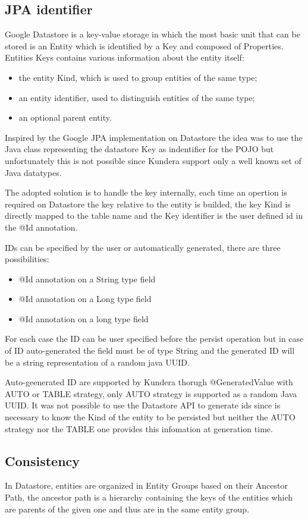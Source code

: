 \subsection{JPA identifier}
Google Datastore is a key-value storage in which the most basic unit that can be stored is an Entity which is identified by a Key and composed of Properties.
Entities Keys contains various information about the entity itself:
\begin{itemize}
\item the entity Kind, which is used to group entities of the same type;
\item an entity identifier, used to distinguish entities of the same type;
\item an optional parent entity. 
\end{itemize}
Inspired by the Google JPA implementation on Datastore the idea was to use the Java class representing the datastore Key as indentifier for the POJO but unfortunately this is not possible since Kundera support only a well known set of Java datatypes.

The adopted solution is to handle the key internally, each time an opertion is required on Datastore the key relative to the entity is builded, the key Kind is directly mapped to the table name and the Key identifier is the user defined id in the @Id annotation.

IDs can be specified by the user or automatically generated, there are three possibilities:
\begin{itemize}
\item @Id annotation on a String type field
\item @Id annotation on a Long type field
\item @Id annotation on a long type field
\end{itemize}
For each case the ID can be user specified before the persist operation but in case of ID auto-generated the field must be of type String and the generated ID will be a string representation of a random java UUID.

Auto-geenerated ID are supported by Kundera thorugh @GeneratedValue with AUTO or TABLE strategy, only AUTO strategy is supported as a random Java UUID. It was not possible to use the Datastore API to generate ids since is necessary to know the Kind of the entity to be persisted but neither the AUTO strategy nor the TABLE one provides this infomation at generation time.

\subsection{Consistency}
In Datastore, entities are organized in Entity Groups based on their Ancestor Path, the ancestor path is a hierarchy containing the keys of the entities which are parents of the given one and thus are in the same entity group.

